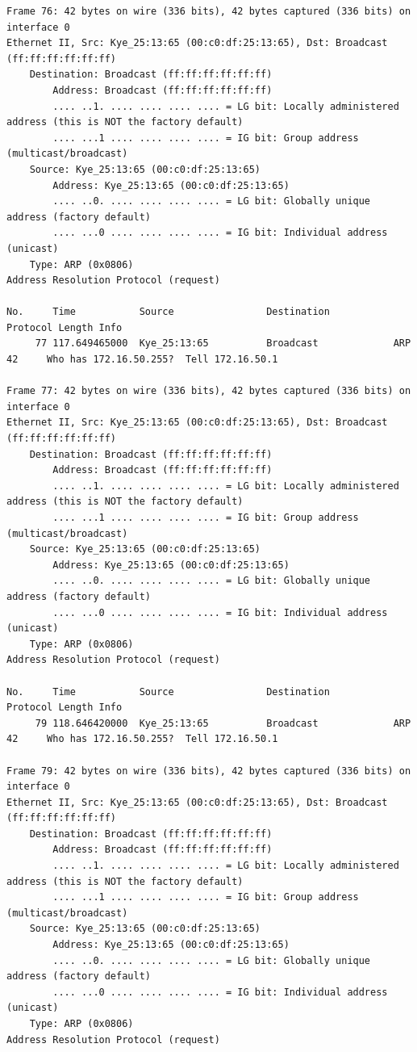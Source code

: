 \documentclass[a4paper,11pt]{article}
\begin{document}
\begin{lstlisting}
Frame 76: 42 bytes on wire (336 bits), 42 bytes captured (336 bits) on interface 0
Ethernet II, Src: Kye_25:13:65 (00:c0:df:25:13:65), Dst: Broadcast (ff:ff:ff:ff:ff:ff)
    Destination: Broadcast (ff:ff:ff:ff:ff:ff)
        Address: Broadcast (ff:ff:ff:ff:ff:ff)
        .... ..1. .... .... .... .... = LG bit: Locally administered address (this is NOT the factory default)
        .... ...1 .... .... .... .... = IG bit: Group address (multicast/broadcast)
    Source: Kye_25:13:65 (00:c0:df:25:13:65)
        Address: Kye_25:13:65 (00:c0:df:25:13:65)
        .... ..0. .... .... .... .... = LG bit: Globally unique address (factory default)
        .... ...0 .... .... .... .... = IG bit: Individual address (unicast)
    Type: ARP (0x0806)
Address Resolution Protocol (request)

No.     Time           Source                Destination           Protocol Length Info
     77 117.649465000  Kye_25:13:65          Broadcast             ARP      42     Who has 172.16.50.255?  Tell 172.16.50.1

Frame 77: 42 bytes on wire (336 bits), 42 bytes captured (336 bits) on interface 0
Ethernet II, Src: Kye_25:13:65 (00:c0:df:25:13:65), Dst: Broadcast (ff:ff:ff:ff:ff:ff)
    Destination: Broadcast (ff:ff:ff:ff:ff:ff)
        Address: Broadcast (ff:ff:ff:ff:ff:ff)
        .... ..1. .... .... .... .... = LG bit: Locally administered address (this is NOT the factory default)
        .... ...1 .... .... .... .... = IG bit: Group address (multicast/broadcast)
    Source: Kye_25:13:65 (00:c0:df:25:13:65)
        Address: Kye_25:13:65 (00:c0:df:25:13:65)
        .... ..0. .... .... .... .... = LG bit: Globally unique address (factory default)
        .... ...0 .... .... .... .... = IG bit: Individual address (unicast)
    Type: ARP (0x0806)
Address Resolution Protocol (request)

No.     Time           Source                Destination           Protocol Length Info
     79 118.646420000  Kye_25:13:65          Broadcast             ARP      42     Who has 172.16.50.255?  Tell 172.16.50.1

Frame 79: 42 bytes on wire (336 bits), 42 bytes captured (336 bits) on interface 0
Ethernet II, Src: Kye_25:13:65 (00:c0:df:25:13:65), Dst: Broadcast (ff:ff:ff:ff:ff:ff)
    Destination: Broadcast (ff:ff:ff:ff:ff:ff)
        Address: Broadcast (ff:ff:ff:ff:ff:ff)
        .... ..1. .... .... .... .... = LG bit: Locally administered address (this is NOT the factory default)
        .... ...1 .... .... .... .... = IG bit: Group address (multicast/broadcast)
    Source: Kye_25:13:65 (00:c0:df:25:13:65)
        Address: Kye_25:13:65 (00:c0:df:25:13:65)
        .... ..0. .... .... .... .... = LG bit: Globally unique address (factory default)
        .... ...0 .... .... .... .... = IG bit: Individual address (unicast)
    Type: ARP (0x0806)
Address Resolution Protocol (request)


\end{lstlisting}
\end{document}

